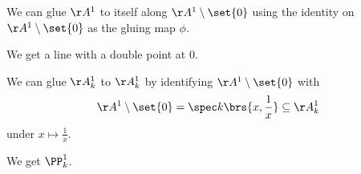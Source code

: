 \documentclass[10pt,a4paper,twoside,openany,hidelinks]{book}
\begin{document}
\begin{example}
We can glue $\AA^1$ to itself along $\AA^1 \setminus \set{0}$ using the identity on $\AA^1 \setminus \set{0}$ as the gluing map $\phi$.

We get a line with a double point at $0$.
\end{example}

\begin{example}
We can glue $\AA_k^1$ to $\AA_k^1$ by identifying $\AA^1 \setminus \set{0}$ with \[\AA^1 \setminus \set{0} = \spec k\brs{x, \frac{1}{x}} \subseteq \AA^1_k\]
under $x \mapsto \frac{1}{x}$.

We get $\PP_k^1$.
\end{example}

\backmatter
\end{document}
